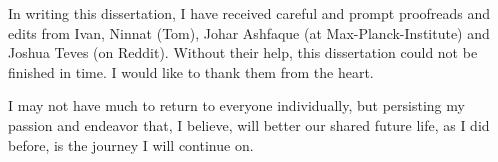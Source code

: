 \begin{acknowledgments}
In writing this dissertation, I have received careful and prompt proofreads and edits from Ivan, Ninnat (Tom), Johar Ashfaque (at Max-Planck-Institute) and Joshua Teves (on Reddit).
Without their help, this dissertation could not be finished in time. I would like to thank them from the heart.

I may not have much to return to everyone individually, but persisting my passion and endeavor that, I believe, will better our shared future life, as I did before, is the journey I will continue on.
\end{acknowledgments} 